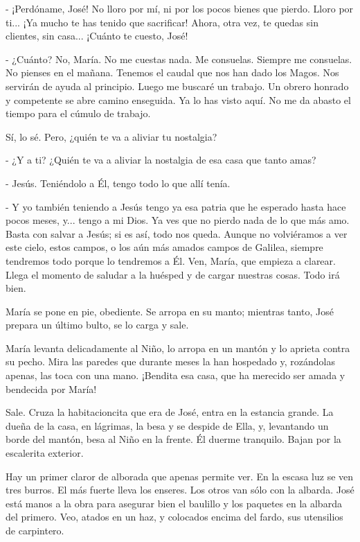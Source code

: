 \documentclass[12pt, twoside, openright]{book} %
\begin{document}
- ¡Perdóname, José! No lloro por mí, ni por los pocos bienes que pierdo. Lloro por ti... ¡Ya mucho te has tenido que sacrificar! Ahora, otra vez, te quedas sin clientes, sin casa... ¡Cuánto te cuesto, José! 

- ¿Cuánto? No, María. No me cuestas nada. Me consuelas. Siempre me consuelas. No pienses en el mañana. Tenemos el caudal que nos han dado los Magos. Nos servirán de ayuda al principio. Luego me buscaré un trabajo. Un obrero honrado y competente se abre camino enseguida. Ya lo has visto aquí. No me da abasto el tiempo para el cúmulo de trabajo. 

Sí, lo sé. Pero, ¿quién te va a aliviar tu nostalgia? 

- ¿Y a ti? ¿Quién te va a aliviar la nostalgia de esa casa que tanto amas? 

- Jesús. Teniéndolo a Él, tengo todo lo que allí tenía. 

- Y yo también teniendo a Jesús tengo ya esa patria que he esperado hasta hace pocos meses, y... tengo a mi Dios. Ya ves que no pierdo nada de lo que más amo. Basta con salvar a Jesús; si es así, todo nos queda. Aunque no volviéramos a ver este cielo, estos campos, o los aún más amados campos de Galilea, siempre tendremos todo porque lo tendremos a Él. Ven, María, que empieza a clarear. Llega el momento de saludar a la huésped y de cargar nuestras cosas. Todo irá bien. 

María se pone en pie, obediente. Se arropa en su manto; mientras tanto, José prepara un último bulto, se lo carga y sale. 

María levanta delicadamente al Niño, lo arropa en un mantón y lo aprieta contra su pecho. Mira las paredes que durante meses la han hospedado y, rozándolas apenas, las toca con una mano. ¡Bendita esa casa, que ha merecido ser amada y bendecida por María! 

Sale. Cruza la habitacioncita que era de José, entra en la estancia grande. La dueña de la casa, en lágrimas, la besa y se despide de Ella, y, levantando un borde del mantón, besa al Niño en la frente. Él duerme tranquilo. Bajan por la escalerita exterior. 

Hay un primer claror de alborada que apenas permite ver. En la escasa luz se ven tres burros. El más fuerte lleva los enseres. Los otros van sólo con la albarda. José está manos a la obra para asegurar bien el baulillo y los paquetes en la albarda del primero. Veo, atados en un haz, y colocados encima del fardo, sus utensilios de carpintero. 
\end{document}
